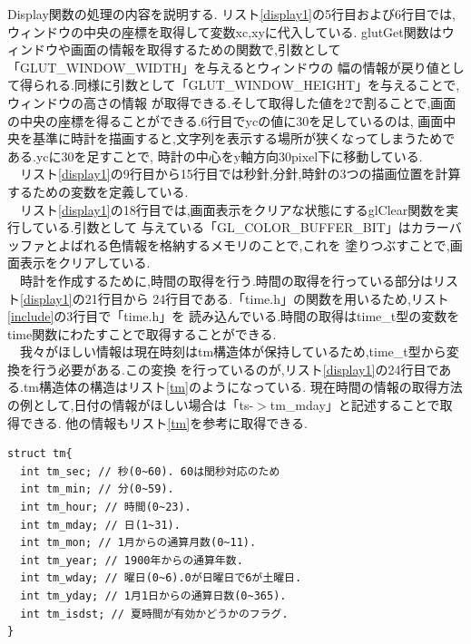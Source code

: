 \documentclass[a4j]{jarticle}
\begin{document}
            Display関数の処理の内容を説明する.     
            リスト\ref{display1}の5行目および6行目では,ウィンドウの中央の座標を取得して変数xc,xyに代入している.
              glutGet関数はウィンドウや画面の情報を取得するための関数で,引数として「GLUT\_WINDOW\_WIDTH」を与えるとウィンドウの
              幅の情報が戻り値として得られる.同様に引数として「GLUT\_WINDOW\_HEIGHT」を与えることで,ウィンドウの高さの情報
              が取得できる.そして取得した値を2で割ることで,画面の中央の座標を得ることができる.6行目でycの値に30を足しているのは,
              画面中央を基準に時計を描画すると,文字列を表示する場所が狭くなってしまうためである.ycに30を足すことで,
              時計の中心をy軸方向30pixel下に移動している.\\
              　リスト\ref{display1}の9行目から15行目では秒針,分針,時針の3つの描画位置を計算するための変数を定義している.\\
              　リスト\ref{display1}の18行目では,画面表示をクリアな状態にするglClear関数を実行している.引数として
              与えている「GL\_COLOR\_BUFFER\_BIT」はカラーバッファとよばれる色情報を格納するメモリのことで,これを
              塗りつぶすことで,画面表示をクリアしている.\\
              　時計を作成するために,時間の取得を行う.時間の取得を行っている部分はリスト\ref{display1}の21行目から
              24行目である.「time.h」の関数を用いるため,リスト\ref{include}の3行目で「time.h」を
              読み込んでいる.時間の取得はtime\_t型の変数をtime関数にわたすことで取得することができる.\\
              　我々がほしい情報は現在時刻はtm構造体が保持しているため,time\_t型から変換を行う必要がある.この変換
              を行っているのが,リスト\ref{display1}の24行目である.tm構造体の構造はリスト\ref{tm}のようになっている.
              現在時間の情報の取得方法の例として,日付の情報がほしい場合は「ts-$>$tm\_mday」と記述することで取得できる.
              他の情報もリスト\ref{tm}を参考に取得できる.

    \begin{lstlisting}[basicstyle=\ttfamily\footnotesize, frame=single,label=tm,caption=tm構造体]
struct tm{
  int tm_sec; // 秒(0~60). 60は閏秒対応のため
  int tm_min; // 分(0~59).
  int tm_hour; // 時間(0~23).
  int tm_mday; // 日(1~31).
  int tm_mon; // 1月からの通算月数(0~11).
  int tm_year; // 1900年からの通算年数.
  int tm_wday; // 曜日(0~6).0が日曜日で6が土曜日.
  int tm_yday; // 1月1日からの通算日数(0~365).
  int tm_isdst; // 夏時間が有効かどうかのフラグ.
}
            \end{lstlisting}
\end{document}
